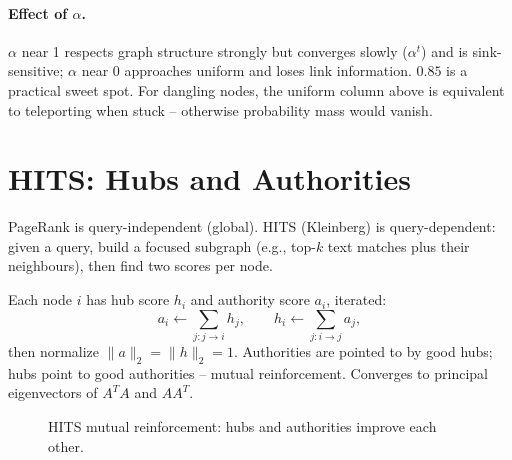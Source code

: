 \paragraph{Effect of $\alpha$.} $\alpha$ near 1 respects graph structure strongly but converges slowly ($\alpha^t$) and is sink-sensitive; $\alpha$ near 0 approaches uniform and loses link information. $0.85$ is a practical sweet spot. For dangling nodes, the uniform column above is equivalent to teleporting when stuck -- otherwise probability mass would vanish.

\section{HITS: Hubs and Authorities}\label{sec:hits}
PageRank is query-independent (global). HITS (Kleinberg) is query-dependent: given a query, build a focused subgraph (e.g., top-$k$ text matches plus their neighbours), then find two scores per node.

\begin{definition}[HITS]
Each node $i$ has hub score $h_i$ and authority score $a_i$, iterated:
\begin{equation}
a_i \leftarrow \sum_{j:j\to i} h_j,\qquad h_i \leftarrow \sum_{j:i\to j} a_j,
\end{equation}
then normalize $\|a\|_2=\|h\|_2=1$. Authorities are pointed to by good hubs; hubs point to good authorities -- mutual reinforcement. Converges to principal eigenvectors of $A^TA$ and $AA^T$.
\end{definition}

\begin{figure}[h]\centering
{}
\caption{HITS mutual reinforcement: hubs and authorities improve each other.}
\label{fig:hits}
\end{figure}


